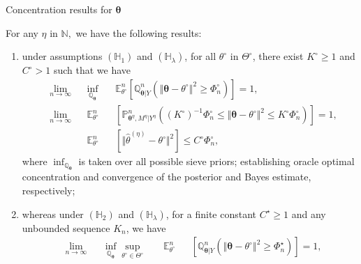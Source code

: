 \documentclass[final,hyperref={pdfpagelabels=false}]{beamer}
\begin{document}
\begin{frame}[t]
\begin{columns}[t]
\begin{column}{.30\textwidth}
\begin{block}{\rule{0pt}{2.5ex} Concentration results for $\boldsymbol{\theta}$}
For any $\eta$ in $\mathbb{N},$ we have the following results:

\medskip

\begin{enumerate}
\item under assumptions $\left(\mathbb{H}_{1}\right)$ and $\left(\mathbb{H}_{\lambda}\right)$, for all $\theta^{\circ}$ in $\Theta^{\circ}$, there exist $K^{\circ} \geq 1$ and $C^{\circ} > 1$ such that we have
\begin{alignat*}{3}
& \lim\limits_{n \rightarrow \infty}&& \inf\limits_{\mathbb{Q}_{\boldsymbol{\theta}}}\,&& \mathbb{E}_{\theta^{\circ}}^{n}\left[\mathbb{Q}_{\boldsymbol{\theta} \vert Y}^{n}\left(\left\Vert \boldsymbol{\theta} - \theta^{\circ} \right\Vert^{2} \geq \Phi_{n}^{\circ}\right)\right] = 1,\\
&\lim\limits_{n \rightarrow \infty} &&\mathbb{E}_{\theta^{\circ}}^{n}&&\left[\mathbb{P}_{\boldsymbol{\theta}^{\eta}, M^{\eta} \vert Y^{\eta}}^{n}\left(\left(K^{\circ}\right)^{-1} \Phi_{n}^{\circ} \leq \Vert \boldsymbol{\theta} - \theta^{\circ} \Vert^{2} \leq K^{\circ} \Phi_{n}^{\circ} \right)\right] = 1,\\
& &&\mathbb{E}_{\theta^{\circ}}^{n}&&\left[\Vert \widehat{\theta}^{\left(\eta\right)} - \theta^{\circ} \Vert^{2}\right] \leq C^{\circ} \Phi_{n}^{\circ},
\end{alignat*}
where $\inf_{\mathbb{Q}_{\boldsymbol{\theta}}}$ is taken over all possible sieve priors; \textcolor{red!90!black}{establishing oracle optimal concentration and convergence of the posterior and Bayes estimate, respectively};
\item whereas under $\left(\mathbb{H}_{2}\right)$ and $\left(\mathbb{H}_{\lambda}\right)$, for a finite constant $C^{\star} \geq 1$ and any unbounded sequence $K_{n}$, we have
\begin{alignat*}{4}
& \lim\limits_{n \rightarrow \infty} && \inf\limits_{\mathbb{Q}_{\boldsymbol{\theta}}}\sup\limits_{\theta^{\circ} \in \Theta^{\circ}}\,&& \mathbb{E}_{\theta^{\circ}}^{n}&&\left[\mathbb{Q}_{\boldsymbol{\theta} \vert Y}^{n}\left(\left\Vert \boldsymbol{\theta} - \theta^{\circ} \right\Vert^{2} \geq \Phi_{n}^{\star}\right)\right] = 1,\\

\end{alignat*}
\end{enumerate}
\end{block}
\end{column}
\end{columns}
\end{frame}
\end{document}
